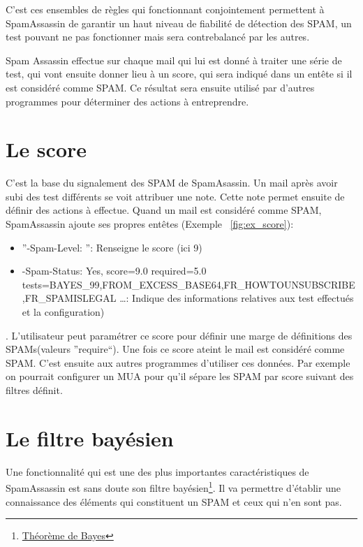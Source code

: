 \documentclass[a4paper,11pt]{article}
\begin{document}
\begin{description}
C'est ces ensembles de règles qui fonctionnant conjointement permettent à SpamAssassin de garantir un haut 
niveau de fiabilité de détection des SPAM, un test pouvant ne pas fonctionner mais sera contrebalancé par les autres.
 \end{description} 


Spam Assassin effectue sur chaque mail qui lui est donné à traiter une série de test, qui vont ensuite donner lieu à un score, qui sera indiqué dans un entête 
si il est considéré comme SPAM. 
Ce résultat sera ensuite utilisé par d'autres programmes pour déterminer des actions à entreprendre.


\section{Le score} \label{score}
C'est la base du signalement des SPAM de SpamAsassin. Un mail après avoir subi des test différents se voit attribuer une note. Cette note permet
ensuite de définir des actions à effectue. Quand un mail est considéré comme SPAM, SpamAssassin ajoute ses propres entêtes (Exemple ~\ref{fig:ex_score}):
\begin{itemize}
 \item ''-Spam-Level: \*\*\*\*\*\*\*\*\* '': Renseigne le score (ici 9)
 \item -Spam-Status: Yes, score=9.0 required=5.0 tests=BAYES\_99,FROM\_EXCESS\_BASE64,FR\_HOWTOUNSUBSCRIBE,FR\_SPAMISLEGAL \dots : Indique des informations relatives aux test effectués et la configuration)
\end{itemize}

. L'utilisateur peut paramétrer ce score pour définir une marge de définitions des SPAMs(valeurs ''require``). Une fois ce score ateint le mail est considéré comme SPAM.
C'est ensuite aux autres programmes d'utiliser ces données. Par exemple on pourrait configurer un MUA pour qu'il sépare 
les SPAM par score suivant des filtres définit. 

\label{baye}
\section{Le filtre bayésien}


Une fonctionnalité qui est une des plus importantes caractéristiques de SpamAssassin est sans doute son filtre
bayésien\footnote{\href {https://fr.wikipedia.org/wiki/Th\%C3\%A9or\%C3\%A8me\_de_Bayes}{Théorème de Bayes}}.
Il va permettre d'établir une connaissance des éléments qui constituent un SPAM et ceux qui n'en sont pas.
\end{document}
